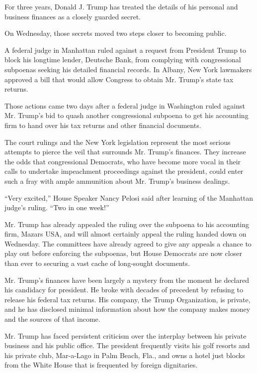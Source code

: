 For three years, Donald J. Trump has treated the details of his personal
and business finances as a closely guarded secret.

On Wednesday, those secrets moved two steps closer to becoming public.

A federal judge in Manhattan ruled against a request from President
Trump to block his longtime lender, Deutsche Bank, from complying with
congressional subpoenas seeking his detailed financial records. In
Albany, New York lawmakers approved a bill that would allow Congress to
obtain Mr. Trump's state tax returns.

Those actions came two days after a federal judge in Washington ruled
against Mr. Trump's bid to quash another congressional subpoena to get
his accounting firm to hand over his tax returns and other financial
documents.

The court rulings and the New York legislation represent the most
serious attempts to pierce the veil that surrounds Mr. Trump's finances.
They increase the odds that congressional Democrats, who have become
more vocal in their calls to undertake impeachment proceedings against
the president, could enter such a fray with ample ammunition about Mr.
Trump's business dealings.

``Very excited,'' House Speaker Nancy Pelosi said after learning of the
Manhattan judge's ruling. ``Two in one week!''

Mr. Trump has already appealed the ruling over the subpoena to his
accounting firm, Mazars USA, and will almost certainly appeal the ruling
handed down on Wednesday. The committees have already agreed to give any
appeals a chance to play out before enforcing the subpoenas, but House
Democrats are now closer than ever to securing a vast cache of
long-sought documents.

Mr. Trump's finances have been largely a mystery from the moment he
declared his candidacy for president. He broke with decades of precedent
by refusing to release his federal tax returns. His company, the Trump
Organization, is private, and he has disclosed minimal information about
how the company makes money and the sources of that income.

Mr. Trump has faced persistent criticism over the interplay between his
private business and his public office. The president frequently visits
his golf resorts and his private club, Mar-a-Lago in Palm Beach, Fla.,
and owns a hotel just blocks from the White House that is frequented by
foreign dignitaries.

